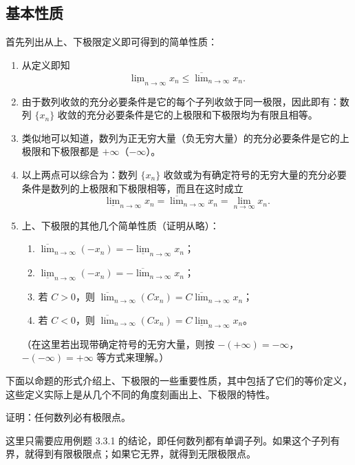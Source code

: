 \subsection{基本性质}

首先列出从上、下极限定义即可得到的简单性质：

\begin{enumerate}
  \item 从定义即知
  \[
    \underline{\lim}_{n\to\infty}x_n\leqslant\overline{\lim}_{n\to\infty}x_n.
  \]
  \item 由于数列收敛的充分必要条件是它的每个子列收敛于同一极限，因此即有：数列 $\{x_n\}$ 收敛的充分必要条件是它的上极限和下极限均为有限且相等。
  \item 类似地可以知道，数列为正无穷大量（负无穷大量）的充分必要条件是它的上极限和下极限都是 $+\infty$（$-\infty$）。
  \item 以上两点可以综合为：数列 $\{x_n\}$ 收敛或为有确定符号的无穷大量的充分必要条件是数列的上极限和下极限相等，而且在这时成立
  \[
    \underline{\lim}_{n\to\infty}x_n
    =\overline{\lim}_{n\to\infty}x_n
    =\lim_{n\to\infty}x_n.
  \]
  \item 上、下极限的其他几个简单性质（证明从略）：
  \begin{enumerate}[label=(\arabic*)]
    \item $\overline{\lim}_{n\to\infty}(-x_n)=-\underline{\lim}_{n\to\infty}x_n$；
    \item $\underline{\lim}_{n\to\infty}(-x_n)=-\overline{\lim}_{n\to\infty}x_n$；
    \item 若 $C>0$，则 $\overline{\lim}_{n\to\infty}(Cx_n)=C\overline{\lim}_{n\to\infty}x_n$；
    \item 若 $C<0$，则 $\overline{\lim}_{n\to\infty}(Cx_n)=C\underline{\lim}_{n\to\infty}x_n$。
  \end{enumerate}

  （在这里若出现带确定符号的无穷大量，则按 $-(+\infty)=-\infty$，$-(-\infty)=+\infty$ 等方式来理解。）
\end{enumerate}

下面以命题的形式介绍上、下极限的一些重要性质，其中包括了它们的等价定义，这些定义实际上是从几个不同的角度刻画出上、下极限的特性。

\begin{xproposition}[3.6.1]
证明：任何数列必有极限点。
\end{xproposition}
\begin{xproof}
这里只需要应用例题 3.3.1 的结论，即任何数列都有单调子列。如果这个子列有界，就得到有限极限点；如果它无界，就得到无限极限点。
\end{xproof}

